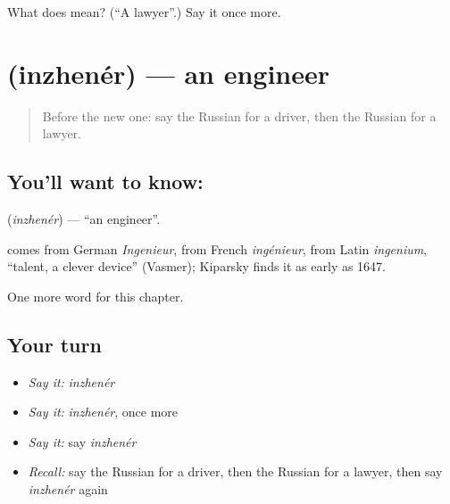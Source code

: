 \begin{tcolorbox}[breakable,colback=teal!4,colframe=teal!35!black,title={Before you move on}]
What does  mean? (\textquotedblleft{}A lawyer\textquotedblright{}.) Say it once more.
\end{tcolorbox}
\section[\texorpdfstring{\ru{инженер} (inzhenér)}{инженер (inzhenér)}]{ (inzhenér) — an engineer}

\label{lesson:RU-C109-engineer}



\begin{quote}
Before the new one: say the Russian for a driver, then the Russian for a lawyer.
\end{quote}

\subsection*{You'll want to know: }
\textbf{} (\emph{inzhenér}) — \textquotedblleft{}an engineer\textquotedblright{}.

\begin{cousinweb}
\textbf{} comes from German \emph{Ingenieur}, from French \emph{ingénieur}, from Latin \emph{ingenium}, \textquotedblleft{}talent, a clever device\textquotedblright{} (Vasmer); Kiparsky finds it as early as 1647.
\end{cousinweb}

\begin{grammarlens}[title={What you've built}]
One more word for this chapter.
\end{grammarlens}

\subsection*{Your turn}
\begin{itemize}
\raggedright
  \item \emph{Say it:} \emph{inzhenér}
  \item \emph{Say it:} \emph{inzhenér}, once more
  \item \emph{Say it:} say \emph{inzhenér}
  \item \emph{Recall:} say the Russian for a driver, then the Russian for a lawyer, then say \emph{inzhenér} again
\end{itemize}

